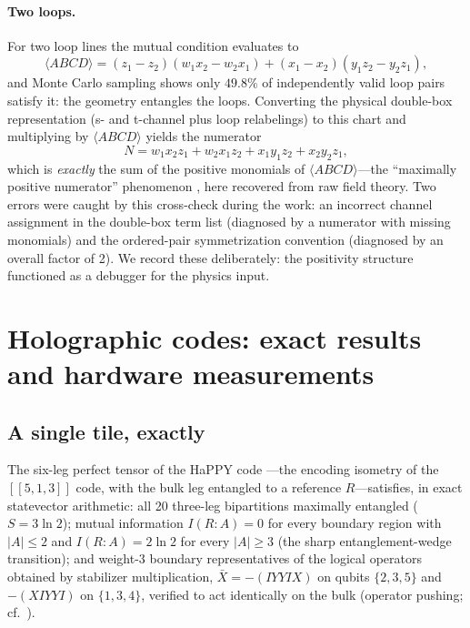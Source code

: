 \documentclass[11pt]{article}
\newcommand{\br}[1]{\langle #1 \rangle}
\begin{document}
\paragraph{Two loops.} For two loop lines the mutual condition
evaluates to
\begin{equation}
\br{ABCD} = (z_1 - z_2)(w_1 x_2 - w_2 x_1) + (x_1 - x_2)(y_1 z_2 - y_2 z_1),
\end{equation}
and Monte Carlo sampling shows only $49.8\%$ of independently valid loop
pairs satisfy it: the geometry entangles the loops. Converting the
physical double-box representation (s- and t-channel plus loop
relabelings) to this chart and multiplying by $\br{ABCD}$ yields the
numerator
\begin{equation}
N = w_1 x_2 z_1 + w_2 x_1 z_2 + x_1 y_1 z_2 + x_2 y_2 z_1,
\end{equation}
which is \emph{exactly} the sum of the positive monomials of
$\br{ABCD}$---the ``maximally positive numerator'' phenomenon
\citep{Kojima:2020gxs}, here recovered from raw field theory. Two errors
were caught by this cross-check during the work: an incorrect channel
assignment in the double-box term list (diagnosed by a numerator with
missing monomials) and the ordered-pair symmetrization convention
(diagnosed by an overall factor of 2). We record these deliberately: the
positivity structure functioned as a debugger for the physics input.

\section{Holographic codes: exact results and hardware measurements}
\label{sec:happy}

\subsection{A single tile, exactly}

The six-leg perfect tensor of the HaPPY code
\citep{Pastawski:2015qua}---the encoding isometry of the
$[[5,1,3]]$ code, with the bulk leg entangled to a reference
$R$---satisfies, in exact statevector arithmetic: all 20 three-leg
bipartitions maximally entangled ($S = 3\ln 2$); mutual information
$I(R{:}A) = 0$ for every boundary region with $|A| \le 2$ and
$I(R{:}A) = 2\ln 2$ for every $|A| \ge 3$ (the sharp entanglement-wedge
transition); and weight-3 boundary representatives of the logical
operators obtained by stabilizer multiplication,
$\bar X = -(IYYIX)$ on qubits $\{2,3,5\}$ and $-(XIYYI)$ on
$\{1,3,4\}$, verified to act identically on the bulk
(operator pushing; cf.\ \citep{Almheiri:2014lwa}).
\end{document}
